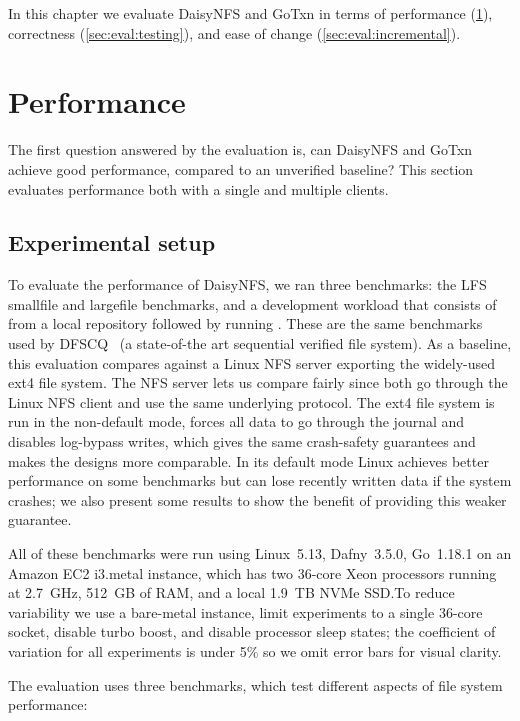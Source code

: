 In this chapter we evaluate DaisyNFS and GoTxn in terms of performance
(\cref{sec:eval:perf}), correctness (\cref{sec:eval:testing}),
and ease of change (\cref{sec:eval:incremental}).

\section{Performance}
\label{sec:eval:perf}

The first question answered by the evaluation is, can DaisyNFS and GoTxn achieve
good performance, compared to an unverified baseline? This section evaluates
performance both with a single and multiple clients.

\subsection{Experimental setup}

To evaluate the performance of DaisyNFS, we ran three benchmarks: the LFS smallfile
and largefile benchmarks, and a development workload that consists of  from a local repository followed by running . These are the same
benchmarks used by DFSCQ~\cite{chen:dfscq} (a state-of-the art sequential
verified file system). As a baseline, this evaluation compares against a Linux
NFS server exporting the widely-used ext4 file system.
The NFS server lets us compare fairly since both go through the Linux NFS client
and use the same underlying protocol. The ext4 file system is run in the
non-default  mode, forces all data to
go through the journal and disables log-bypass writes, which gives the same
crash-safety guarantees and makes the designs more comparable. In its default
 mode Linux achieves better performance on some benchmarks but
can lose recently written data if the system crashes; we also present some results to
show the benefit of providing this weaker guarantee.

All of these benchmarks were run using Linux~5.13, Dafny~3.5.0, Go~1.18.1 on an Amazon
EC2 i3.metal instance, which has two 36-core Xeon processors running at 2.7~GHz, 512~GB of RAM, and a local 1.9~TB
NVMe SSD.\@ To reduce variability we use a bare-metal instance, limit experiments to a single 36-core
socket, disable turbo boost, and disable processor sleep states; the coefficient
of variation for all experiments is under 5\% so we omit error bars for visual
clarity.

\vspace{0.5\baselineskip}
The evaluation uses three benchmarks, which test different aspects of file system performance:
\vspace{-\baselineskip}

